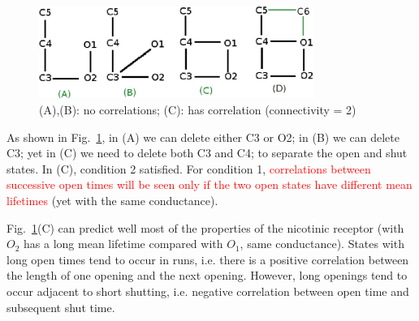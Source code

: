 

\begin{figure}[hbt]
  \centerline{\includegraphics[height=3cm, angle=0]{./images/state_scheme.eps}}
  \caption{(A),(B): no correlations; (C): has correlation (connectivity
    = 2)}
  \label{fig:state_scheme}
\end{figure}

As shown in Fig.~\ref{fig:state_scheme}, in (A) we can delete either
C3 or O2; in (B) we can delete C3; yet in (C) we need to delete both
C3 and C4; to separate the open and shut states. In (C), condition 2
satisfied. For condition 1,
\textcolor{red}{correlations between successive open times will be
  seen only if the two open states have different mean lifetimes}
(yet with the same conductance).

\begin{framed}
  Fig.~\ref{fig:state_scheme}(C) can predict well most of the
  properties of the nicotinic receptor (with $O_2$ has a long mean
  lifetime compared with $O_1$, same conductance). States with long
  open times tend to occur in runs, i.e. there is a positive
  correlation between the length of one opening and the next
  opening. However, long openings tend to occur adjacent to short
  shutting, i.e. negative correlation between open time and subsequent
  shut time.
\end{framed}

